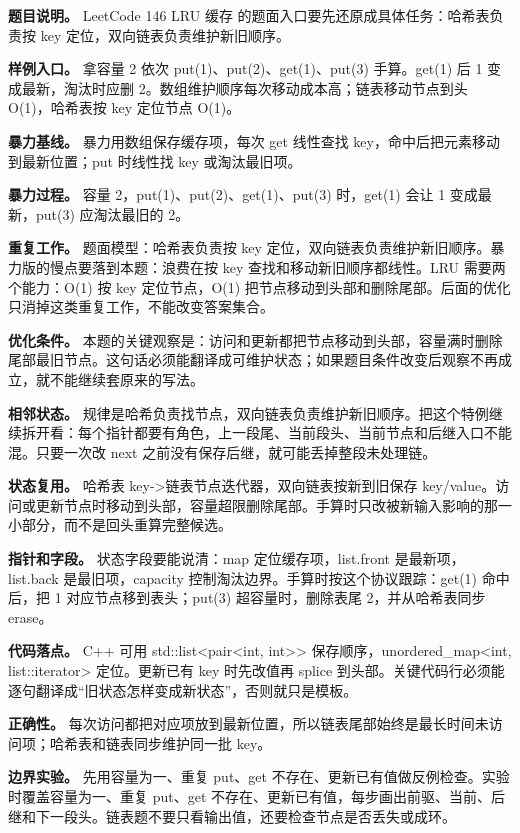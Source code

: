 \textbf{题目说明。} LeetCode 146 LRU 缓存 的题面入口要先还原成具体任务：哈希表负责按 key 定位，双向链表负责维护新旧顺序。

\textbf{样例入口。} 拿容量 2 依次 put(1)、put(2)、get(1)、put(3) 手算。get(1) 后 1 变成最新，淘汰时应删 2。数组维护顺序每次移动成本高；链表移动节点到头 O(1)，哈希表按 key 定位节点 O(1)。

\textbf{暴力基线。} 暴力用数组保存缓存项，每次 get 线性查找 key，命中后把元素移动到最新位置；put 时线性找 key 或淘汰最旧项。

\textbf{暴力过程。} 容量 2，put(1)、put(2)、get(1)、put(3) 时，get(1) 会让 1 变成最新，put(3) 应淘汰最旧的 2。

\textbf{重复工作。} 题面模型：哈希表负责按 key 定位，双向链表负责维护新旧顺序。暴力版的慢点要落到本题：浪费在按 key 查找和移动新旧顺序都线性。LRU 需要两个能力：O(1) 按 key 定位节点，O(1) 把节点移动到头部和删除尾部。后面的优化只消掉这类重复工作，不能改变答案集合。

\textbf{优化条件。} 本题的关键观察是：访问和更新都把节点移动到头部，容量满时删除尾部最旧节点。这句话必须能翻译成可维护状态；如果题目条件改变后观察不再成立，就不能继续套原来的写法。

\textbf{相邻状态。} 规律是哈希负责找节点，双向链表负责维护新旧顺序。把这个特例继续拆开看：每个指针都要有角色，上一段尾、当前段头、当前节点和后继入口不能混。只要一次改 next 之前没有保存后继，就可能丢掉整段未处理链。

\textbf{状态复用。} 哈希表 key->链表节点迭代器，双向链表按新到旧保存 key/value。访问或更新节点时移动到头部，容量超限删除尾部。手算时只改被新输入影响的那一小部分，而不是回头重算完整候选。

\textbf{指针和字段。} 状态字段要能说清：map 定位缓存项，list.front 是最新项，list.back 是最旧项，capacity 控制淘汰边界。手算时按这个协议跟踪：get(1) 命中后，把 1 对应节点移到表头；put(3) 超容量时，删除表尾 2，并从哈希表同步 erase。

\textbf{代码落点。} C++ 可用 std::list<pair<int, int>> 保存顺序，unordered\_map<int, list::iterator> 定位。更新已有 key 时先改值再 splice 到头部。关键代码行必须能逐句翻译成“旧状态怎样变成新状态”，否则就只是模板。

\textbf{正确性。} 每次访问都把对应项放到最新位置，所以链表尾部始终是最长时间未访问项；哈希表和链表同步维护同一批 key。

\textbf{边界实验。} 先用容量为一、重复 put、get 不存在、更新已有值做反例检查。实验时覆盖容量为一、重复 put、get 不存在、更新已有值，每步画出前驱、当前、后继和下一段头。链表题不要只看输出值，还要检查节点是否丢失或成环。

